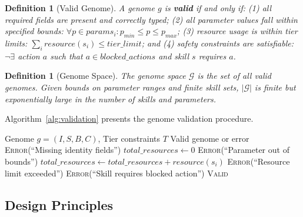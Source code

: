 \documentclass[conference]{IEEEtran}
\newcommand{\genomespace}{\mathcal{G}}
\newtheorem{definition}[theorem]{Definition}
\begin{document}
\begin{definition}[Valid Genome]
A genome $g$ is \textbf{valid} if and only if: (1) all required fields are present and correctly typed; (2) all parameter values fall within specified bounds: $\forall p \in params_i: p_{min} \leq p \leq p_{max}$; (3) resource usage is within tier limits: $\sum_i resource(s_i) \leq tier\_limit$; and (4) safety constraints are satisfiable: $\neg \exists$ action $a$ such that $a \in blocked\_actions$ and skill $s$ requires $a$.
\end{definition}

\begin{definition}[Genome Space]
The genome space $\genomespace$ is the set of all valid genomes. Given bounds on parameter ranges and finite skill sets, $|\genomespace|$ is finite but exponentially large in the number of skills and parameters.
\end{definition}

Algorithm~\ref{alg:validation} presents the genome validation procedure.

\begin{algorithm}[t]
\caption{Genome Validation}
\label{alg:validation}
\begin{algorithmic}[1]
\Require Genome $g = (I, S, B, C)$, Tier constraints $T$
\Ensure Valid genome or error
        \State \Return \textsc{Error}(``Missing identity fields'')
    \EndIf
    \State $total\_resources \gets 0$
                    \State \Return \textsc{Error}(``Parameter out of bounds'')
                \EndIf
            \EndFor
            \State $total\_resources \gets total\_resources + resource(s_i)$
        \EndIf
    \EndFor
        \State \Return \textsc{Error}(``Resource limit exceeded'')
    \EndIf
        \State \Return \textsc{Error}(``Skill requires blocked action'')
    \EndIf
    \State \Return \textsc{Valid}
\EndFunction
\end{algorithmic}
\end{algorithm}

\subsection{Design Principles}
\end{document}
